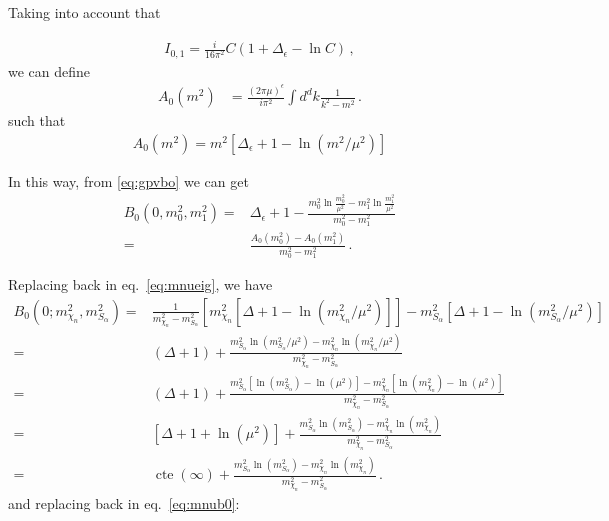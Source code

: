 Taking into account that

\begin{align}
  \label{eq:I01}
  I_{0,1}=\frac{i}{16 \pi^{2}} C\left(1+\Delta_{\epsilon}-\ln C\right)\,,
\end{align}
we can define
\begin{align}
   A_{0}\left(m^{2}\right) &=\frac{(2 \pi \mu)^{\epsilon}}{i \pi^{2}} \int d^{d} k \frac{1}{k^{2}-m^{2}}\,.
\end{align}
such that
\begin{align*}
  A_0\left(m^2\right)=m^2 \left[ \Delta_{\epsilon}+1-\ln \left( m^2/\mu^2 \right) \right]
\end{align*}

In this way, from \eqref{eq:gpvbo} we can get
\begin{align}
  B_{0}\left(0, m_{0}^{2}, m_{1}^{2}\right)=&\Delta_{\epsilon}+1-\frac{m_{0}^{2} \ln \frac{m_{0}^{2}}{\mu^{2}}-m_{1}^{2} \ln \frac{m_{1}^{2}}{\mu^{2}}}{m_{0}^{2}-m_{1}^{2}} \nonumber\\
 =&\frac{A_{0}\left(m_{0}^{2}\right)-A_{0}\left(m_{1}^{2}\right)}{m_{0}^{2}-m_{1}^{2}}\,.
\end{align}


Replacing back in eq.~\eqref{eq:mnueig}, we have
\begin{align}
   B_0 \left(0;m_{\chi_n}^2,m^2_{S_{\alpha}} \right)=&
   \frac{1}{m_{\chi_n}^2-m_{S_\alpha}^2}\left[m^2_{\chi_n} \left[ \Delta+1-\ln \left( m_{\chi_n}^2/\mu^2 \right) \right]  \right] 
-m_{S_\alpha}^2 \left[ \Delta+1-\ln \left( m_{S_\alpha}^2/\mu^2 \right) \right] \nonumber\\
  =&(\Delta+1)+\frac{m_{S_\alpha}^2\ln \left( m_{S_\alpha}^2/\mu^2 \right)-m_{\chi_n}^2\ln \left( m_{\chi_n}^2/\mu^2 \right)}{m_{\chi_n}^2-m_{S_\alpha}^2} \nonumber\\
 =&(\Delta+1)+\frac{m_{S_\alpha}^2 \left[ \ln \left( m_{S_\alpha}^2 \right)-\ln \left( \mu^2 \right) \right]-
     m_{\chi_n}^2 \left[ \ln \left( m_{\chi_n}^2 \right)-\ln \left( \mu^2 \right) \right]}{m_{\chi_n}^2-m_{S_\alpha}^2} \nonumber\\  
=&\left[\Delta+1+\ln\left( \mu^2 \right) \right]+\frac{m_{S_\alpha}^2\ln \left( m_{S_\alpha}^2 \right)-m_{\chi_n}^2\ln \left( m_{\chi_n}^2 \right)}{m_{\chi_n}^2-m_{S_\alpha}^2} \nonumber\\
=&\operatorname{cte}(\infty)+\frac{m_{S_\alpha}^2\ln \left( m_{S_\alpha}^2 \right)-m_{\chi_n}^2\ln \left( m_{\chi_n}^2 \right)}{m_{\chi_n}^2-m_{S_\alpha}^2} \,.
\end{align}
and replacing back in eq.~\eqref{eq:mnub0}:

